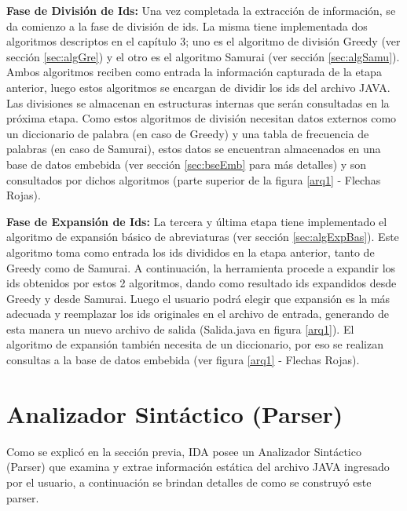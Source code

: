 \documentclass[a4paper,12pt]{report}
\begin{document}
\textbf{Fase de División de Ids:} Una vez completada la extracción de información, se da comienzo a la fase de división de ids. La misma tiene implementada dos algoritmos descriptos en el capítulo 3; uno es el algoritmo de división Greedy (ver sección \ref{sec:algGre}) y el otro es el algoritmo Samurai (ver sección \ref{sec:algSamu}). Ambos algoritmos reciben como entrada la información capturada de la etapa anterior, luego estos algoritmos se encargan de dividir los ids del archivo JAVA. Las divisiones se almacenan en estructuras internas que serán consultadas en la próxima etapa. Como estos algoritmos de división necesitan datos externos como un diccionario de palabra (en caso de Greedy) y una tabla de frecuencia de palabras (en caso de Samurai), estos datos se encuentran almacenados en una base de datos embebida (ver sección \ref{sec:bseEmb} para más detalles) y son consultados por dichos algoritmos (parte superior de la figura \ref{arq1} - Flechas Rojas).

\textbf{Fase de Expansión de Ids:} La tercera y última etapa tiene implementado el algoritmo de expansión básico de abreviaturas (ver sección \ref{sec:algExpBas}). Este algoritmo toma como entrada los ids divididos en la etapa anterior, tanto de Greedy como de Samurai. A continuación, la herramienta procede a expandir los ids obtenidos por estos 2 algoritmos, dando como resultado ids expandidos desde Greedy y desde Samurai. Luego el usuario podrá elegir que expansión es la más adecuada y reemplazar los ids originales en el archivo de entrada, generando de esta manera un nuevo archivo de salida (Salida.java en figura \ref{arq1}). El algoritmo de expansión también necesita de un diccionario, por eso se realizan consultas a la base de datos embebida (ver figura \ref{arq1} - Flechas Rojas).

\section{Analizador Sintáctico (Parser)}

Como se explicó en la sección previa, IDA posee un Analizador Sintáctico (Parser) que examina y extrae información estática del archivo JAVA ingresado por el usuario, a continuación se brindan detalles de como se construyó este parser.
\end{document}
